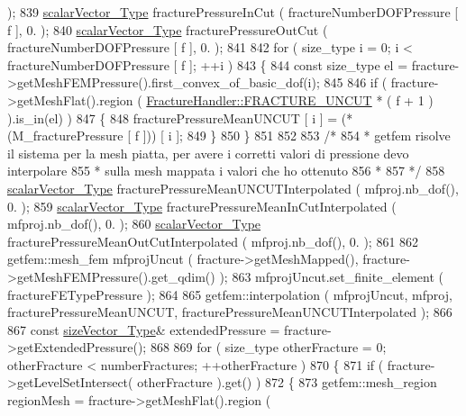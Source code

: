 \begin{DoxyCode}
      );
839         \hyperlink{Core_8h_a4e75b5863535ba1dd79942de2846eff0}{scalarVector\_Type} fracturePressureInCut ( fractureNumberDOFPressure [ f ], 0. );
840         \hyperlink{Core_8h_a4e75b5863535ba1dd79942de2846eff0}{scalarVector\_Type} fracturePressureOutCut ( fractureNumberDOFPressure [ f ], 0. );
841 
842         \textcolor{keywordflow}{for} ( size\_type i = 0; i < fractureNumberDOFPressure [ f ]; ++i )
843         \{
844             \textcolor{keyword}{const} size\_type el =  fracture->getMeshFEMPressure().first\_convex\_of\_basic\_dof(i);
845         
846             \textcolor{keywordflow}{if} ( fracture->getMeshFlat().region ( 
      \hyperlink{classFractureHandler_a495ad4fc72d0c47c8f0424842f1153aaaa992cc3ad024a030ecd798dc319c95ac}{FractureHandler::FRACTURE\_UNCUT} * ( f + 1 ) ).is\_in(el) )
847             \{   
848                 fracturePressureMeanUNCUT [ i ] = (*(M\_fracturePressure [ f ])) [ i ];
849             \}
850         \}
851 
852         
853         \textcolor{comment}{/*}
854 \textcolor{comment}{         * getfem risolve il sistema per la mesh piatta, per avere i corretti valori di pressione devo
       interpolare}
855 \textcolor{comment}{         * sulla mesh mappata i valori che ho ottenuto}
856 \textcolor{comment}{         * }
857 \textcolor{comment}{         */}
858         \hyperlink{Core_8h_a4e75b5863535ba1dd79942de2846eff0}{scalarVector\_Type} fracturePressureMeanUNCUTInterpolated ( mfproj.nb\_dof(), 0. );
859         \hyperlink{Core_8h_a4e75b5863535ba1dd79942de2846eff0}{scalarVector\_Type} fracturePressureMeanInCutInterpolated ( mfproj.nb\_dof(), 0. );
860         \hyperlink{Core_8h_a4e75b5863535ba1dd79942de2846eff0}{scalarVector\_Type} fracturePressureMeanOutCutInterpolated ( mfproj.nb\_dof(), 0. );
861 
862         getfem::mesh\_fem mfprojUncut ( fracture->getMeshMapped(), fracture->getMeshFEMPressure().get\_qdim()
      );
863         mfprojUncut.set\_finite\_element ( fractureFETypePressure );
864 
865         getfem::interpolation ( mfprojUncut, mfproj, fracturePressureMeanUNCUT, 
      fracturePressureMeanUNCUTInterpolated );
866 
867         \textcolor{keyword}{const} \hyperlink{Core_8h_a83c51913d041a5001e8683434c09857f}{sizeVector\_Type}& extendedPressure = fracture->getExtendedPressure();
868 
869         \textcolor{keywordflow}{for} ( size\_type otherFracture = 0; otherFracture < numberFractures; ++otherFracture )
870         \{
871             \textcolor{keywordflow}{if} ( fracture->getLevelSetIntersect( otherFracture ).get() )
872             \{
873                 getfem::mesh\_region regionMesh = fracture->getMeshFlat().region ( 

\end{DoxyCode}
